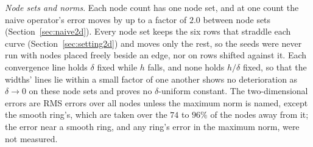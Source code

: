 \documentclass[11pt]{amsart}
\theoremstyle{definition}
\theoremstyle{remark}
\newcommand{\para}[1]{\par\smallskip\noindent\textit{#1}.\enspace}
\begin{document}
\para{Node sets and norms}
Each node count has one node set, and at one count the naive operator's
error moves by up to a factor of $2.0$ between node sets
(Section~\ref{sec:naive2d}). Every node set keeps the six rows that
straddle each curve (Section~\ref{sec:setting2d}) and moves only the rest,
so the seeds were never run with nodes placed freely beside an edge, nor on
rows shifted against it. Each convergence line holds $\delta$ fixed while
$h$ falls, and none holds $h / \delta$ fixed, so that the widths' lines lie
within a small factor of one another shows no deterioration as
$\delta \to 0$ on these node sets and proves no $\delta$-uniform constant.
The two-dimensional errors are RMS errors over all nodes unless the maximum
norm is named, except the smooth ring's, which are
taken over the $74$ to $96\%$ of the nodes away from it; the error near a
smooth ring, and any ring's error in the maximum norm, were not measured.
\end{document}
